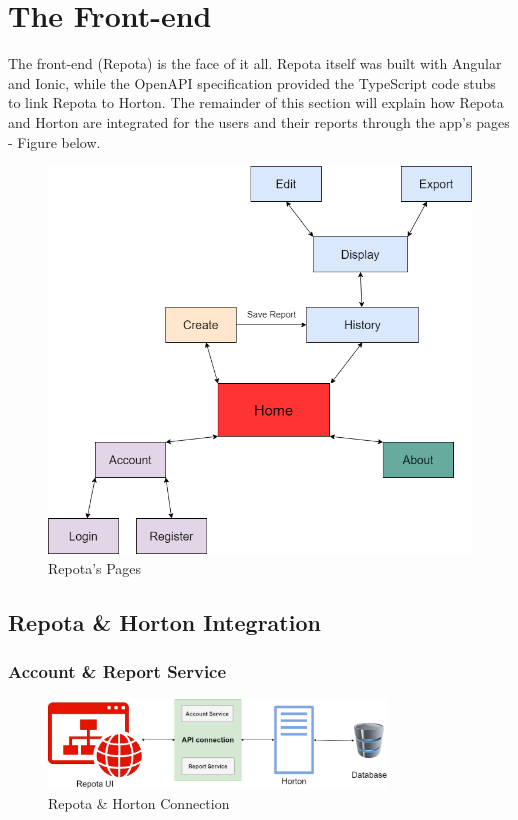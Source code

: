 \section{The Front-end}
The front-end (Repota) is the face of it all. Repota itself was built with Angular and Ionic, while the OpenAPI specification provided the TypeScript code stubs to link Repota to Horton. The remainder of this section will explain how Repota and Horton are integrated for the users and their reports through the app's pages - Figure below.
\begin{figure}[H]
    \caption{Repota's Pages}
    \label{image:repotaPages}
    \centering
    \includegraphics[width=1.0\textwidth]{images/repota/pages_diagram.png}
\end{figure}
\newpage

\subsection{Repota \& Horton Integration}
\subsubsection{Account \& Report Service}
\begin{figure}[H]
    \caption{Repota \& Horton Connection}
    \label{image:repotaNhorton}
    \centering
    \includegraphics[width=0.8\textwidth]{images/repota_and_horton/repota_n_horton.png}
\end{figure}

